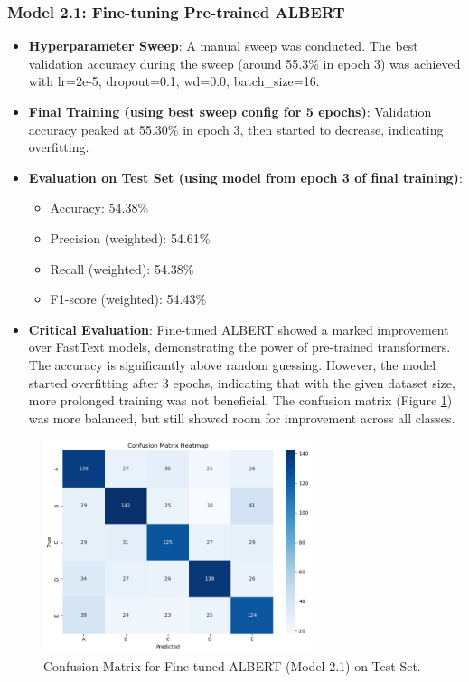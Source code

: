 \documentclass[10.5pt]{article}
\begin{document}
\subsubsection{Model 2.1: Fine-tuning Pre-trained ALBERT}
\begin{itemize}
    \item \textbf{Hyperparameter Sweep}: A manual sweep was conducted. The best validation accuracy during the sweep (around 55.3\% in epoch 3) was achieved with lr=2e-5, dropout=0.1, wd=0.0, batch\_size=16.
    \item \textbf{Final Training (using best sweep config for 5 epochs)}: Validation accuracy peaked at 55.30\% in epoch 3, then started to decrease, indicating overfitting.
    \item \textbf{Evaluation on Test Set (using model from epoch 3 of final training)}:
        \begin{itemize}
            \item Accuracy: 54.38\%
            \item Precision (weighted): 54.61\%
            \item Recall (weighted): 54.38\%
            \item F1-score (weighted): 54.43\%
        \end{itemize}
    \item \textbf{Critical Evaluation}: Fine-tuned ALBERT showed a marked improvement over FastText models, demonstrating the power of pre-trained transformers. The accuracy is significantly above random guessing. However, the model started overfitting after 3 epochs, indicating that with the given dataset size, more prolonged training was not beneficial. The confusion matrix (Figure \ref{fig:conf_matrix_model2_1}) was more balanced, but still showed room for improvement across all classes.
\end{itemize}

\begin{figure}[htbp]
    \centering
    \includegraphics[width=0.7\textwidth]{images/model2_1_confusion_matrix.png} 
    \caption{Confusion Matrix for Fine-tuned ALBERT (Model 2.1) on Test Set.}
    \label{fig:conf_matrix_model2_1}
\end{figure}
\end{document}
